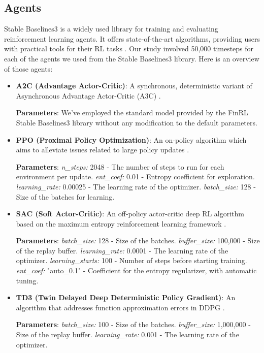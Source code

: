 \documentclass[12pt]{article}
\begin{document}
\subsection{Agents}%
\label{subsubsec:agents}
Stable Baselines3 is a widely used library for training and evaluating reinforcement learning agents. It offers state-of-the-art algorithms, providing users with practical tools for their RL tasks \cite{stable-baselines3}. Our study involved 50,000 timesteps for each of the agents we used from the Stable Baselines3 library. Here is an overview of those agents:
\begin{itemize}
\item \textbf{A2C (Advantage Actor-Critic)}: A synchronous, deterministic variant of Asynchronous Advantage Actor-Critic (A3C) \cite{mnih2016asynchronous}.

\textbf{Parameters}: We've employed the standard model provided by the FinRL Stable Baselines3 library without any modification to the default parameters.
\item \textbf{PPO (Proximal Policy Optimization)}: An on-policy algorithm which aims to alleviate issues related to large policy updates \cite{schulman2017proximal}.

\textbf{Parameters}:
\textit{n\_steps:} 2048 - The number of steps to run for each environment per update.
\textit{ent\_coef:} 0.01 - Entropy coefficient for exploration.
\textit{learning\_rate:} 0.00025 - The learning rate of the optimizer.
\textit{batch\_size:} 128 - Size of the batches for learning.
\item \textbf{SAC (Soft Actor-Critic)}: An off-policy actor-critic deep RL algorithm based on the maximum entropy reinforcement learning framework \cite{haarnoja2018soft}.

\textbf{Parameters}:
\textit{batch\_size:} 128 - Size of the batches.
\textit{buffer\_size:} 100,000 - Size of the replay buffer.
\textit{learning\_rate:} 0.0001 - The learning rate of the optimizer.
\textit{learning\_starts:} 100 - Number of steps before starting training.
\textit{ent\_coef:} "auto\_0.1" - Coefficient for the entropy regularizer, with automatic tuning.

\item \textbf{TD3 (Twin Delayed Deep Deterministic Policy Gradient)}: An algorithm that addresses function approximation errors in DDPG \cite{fujimoto2018addressing}.

\textbf{Parameters}:
\textit{batch\_size:} 100 - Size of the batches.
\textit{buffer\_size:} 1,000,000 - Size of the replay buffer.
\textit{learning\_rate:} 0.001 - The learning rate of the optimizer.


\end{itemize}
\end{document}
